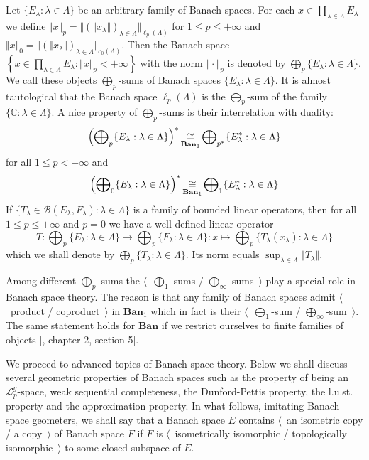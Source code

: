 Let $\{E_\lambda:\lambda\in\Lambda\}$ be an arbitrary family of Banach spaces. For each $x\in \prod_{\lambda\in\Lambda} E_\lambda$ we define
$\Vert x\Vert_p=\Vert(\Vert x_\lambda\Vert)_{\lambda\in\Lambda}\Vert_{\ell_p(\Lambda)}$ for $1\leq p\leq +\infty$ and $\Vert x\Vert_0=\Vert(\Vert x_\lambda\Vert)_{\lambda\in\Lambda}\Vert_{c_0(\Lambda)}$. Then the Banach space $\left\{x\in \prod_{\lambda\in\Lambda} E_\lambda: \Vert x\Vert_p<+\infty\right\}$ with the norm $\Vert\cdot\Vert_p$ is denoted by $\bigoplus_p\{E_\lambda:\lambda\in\Lambda\}$. We call these objects $\bigoplus_p$-sums of Banach spaces $\{E_\lambda:\lambda\in\Lambda\}$. It is almost tautological that the Banach space $\ell_p(\Lambda)$ is the $\bigoplus_p$-sum of the family $\{\mathbb{C}:\lambda\in\Lambda\}$. A nice property of $\bigoplus_p$-sums is their interrelation with duality:
$$
\left(\bigoplus\nolimits_p\{E_\lambda:\lambda\in\Lambda\}\right)^*\mathop{\mathbin{\cong}}\limits_{\mathbf{Ban}_1}
\bigoplus\nolimits_{p^*}\{E_\lambda^*:\lambda\in\Lambda\}
$$
for all $1\leq p<+\infty$ and 
$$
\left(\bigoplus\nolimits_0\{E_\lambda:\lambda\in\Lambda\}\right)^*\mathop{\mathbin{\cong}}\limits_{\mathbf{Ban}_1}
\bigoplus\nolimits_1\{E_\lambda^*:\lambda\in\Lambda\}
$$
If $\{T_\lambda\in\mathcal{B}(E_\lambda, F_\lambda):\lambda\in\Lambda\}$ is a family of bounded linear operators, then for all $1\leq p\leq+\infty$ and $p=0$ we have a well defined linear operator
$$
T:\bigoplus\nolimits_p\{E_\lambda:\lambda\in\Lambda\}\to \bigoplus\nolimits_p\{ F_\lambda:\lambda\in\Lambda\}:x\mapsto \bigoplus\nolimits_p\{ T_\lambda(x_\lambda):\lambda\in\Lambda\}
$$
which we shall denote by $\bigoplus_p\{T_\lambda:\lambda\in\Lambda\}$. Its norm equals $\sup_{\lambda\in\Lambda}\Vert T_\lambda\Vert$.

Among different $\bigoplus_p$-sums the $\langle$~$\bigoplus_1$-sums / $\bigoplus_\infty$-sums~$\rangle$ play a special role in Banach space theory. The reason is that any family of Banach spaces admit $\langle$~product / coproduct~$\rangle$ in $\mathbf{Ban}_1$ which in fact is their $\langle$~$\bigoplus_1$-sum / $\bigoplus_\infty$-sum~$\rangle$. The same statement holds for $\mathbf{Ban}$ if we restrict ourselves to finite families of objects [\cite{HelLectAndExOnFuncAn}, chapter 2, section 5].

We proceed to advanced topics of Banach space theory. Below we shall discuss several geometric properties of Banach spaces such as the property of being an $\mathscr{L}_p^g$-space, weak sequential completeness, the Dunford-Pettis property, the l.u.st. property and the approximation property. In what follows, imitating Banach space geometers, we shall say that a Banach space $E$ contains $\langle$~an isometric copy / a copy~$\rangle$ of Banach space $F$ if $F$ is $\langle$~isometrically isomorphic / topologically isomorphic~$\rangle$ to some closed subspace of $E$.

